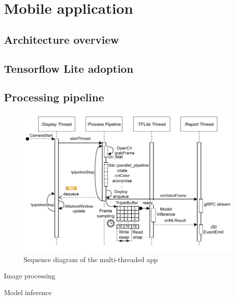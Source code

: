 \section{Mobile application}
\label{sec:Mobile application}

\subsection{Architecture overview}

\subsection{Tensorflow Lite adoption}

\subsection{Processing pipeline}

\begin{figure}[!ht]
    \centering
    \includegraphics[width=\textwidth]{implementation/imgs/4-model-infer.pdf}
    \caption{Sequence diagram of the multi-threaded app}
    \label{fig:4-model-infer}
\end{figure}
\begin{minipage}{.5\textwidth}
\begin{algorithm}[H]

\caption{Image processing}
\label{algo:Image processing}
\end{algorithm}
\end{minipage}
\vline
\begin{minipage}{.5\textwidth}
\begin{algorithm}[H]

\caption{Model inference}
\label{algo:Model inference}
\end{algorithm}
\end{minipage}
